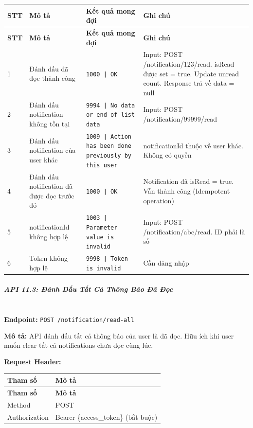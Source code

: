 \begin{longtable}{|p{}|p{}|p{}|p{}|}
\hline
\textbf{STT} & \textbf{Mô tả} & \textbf{Kết quả mong đợi} & \textbf{Ghi chú} \\
\hline
\endfirsthead

\hline
\textbf{STT} & \textbf{Mô tả} & \textbf{Kết quả mong đợi} & \textbf{Ghi chú} \\
\hline
\endhead

\hline
\endfoot

1 & Đánh dấu đã đọc thành công & \texttt{1000 | OK} & Input: POST /notification/123/read. isRead được set = true. Update unread count. Response trả về data = null \\
\hline
2 & Đánh dấu notification không tồn tại & \texttt{9994 | No data or end of list data} & Input: POST /notification/99999/read \\
\hline
3 & Đánh dấu notification của user khác & \texttt{1009 | Action has been done previously by this user} & notificationId thuộc về user khác. Không có quyền \\
\hline
4 & Đánh dấu notification đã được đọc trước đó & \texttt{1000 | OK} & Notification đã isRead = true. Vẫn thành công (Idempotent operation) \\
\hline
5 & notificationId không hợp lệ & \texttt{1003 | Parameter value is invalid} & Input: POST /notification/abc/read. ID phải là số \\
\hline
6 & Token không hợp lệ & \texttt{9998 | Token is invalid} & Cần đăng nhập \\
\hline
\end{longtable}

\subparagraph{API 11.3: Đánh Dấu Tất Cả Thông Báo Đã Đọc}~\\

\textbf{Endpoint:} \texttt{POST /notification/read-all}

\textbf{Mô tả:} API đánh dấu tất cả thông báo của user là đã đọc. Hữu ích khi user muốn clear tất cả notifications chưa đọc cùng lúc.

\textbf{Request Header:}

\begin{longtable}{|p{}|p{}|}
\hline
\textbf{Tham số} & \textbf{Mô tả} \\
\hline
\endfirsthead

\hline
\textbf{Tham số} & \textbf{Mô tả} \\
\hline
\endhead

\hline
\endfoot

Method & POST \\
\hline
Authorization & Bearer \{access\_token\} (bắt buộc) \\
\hline
\end{longtable}

